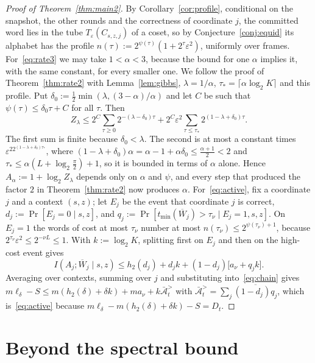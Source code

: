 \documentclass[aps,prx,twocolumn,superscriptaddress,nofootinbib,longbibliography]{revtex4-2}
\theoremstyle{plain}
\theoremstyle{definition}
\theoremstyle{remark}
\begin{document}
\begin{proof}[Proof of Theorem~\ref{thm:main2}]
By Corollary~\ref{cor:profile}, conditional on the snapshot, the other rounds and the correctness of coordinate $j$, the committed word lies in the tube $T_\varepsilon(C_{s,z,j})$ of a coset, so by Conjecture~\ref{conj:equid} its alphabet has the profile $n(\tau):=2^{\psi(\tau)}(1+2^\tau\varepsilon^2)$, uniformly over frames. For~\eqref{eq:rate3} we may take $1<\alpha<3$, because the bound for one $\alpha$ implies it, with the same constant, for every smaller one. We follow the proof of Theorem~\ref{thm:rate2} with Lemma~\ref{lem:gibbs}, $\lambda=1/\alpha$, $\tau_*=\lceil\alpha\log_2K\rceil$ and this profile. Put $\delta_0:=\tfrac12\min(\lambda,(3-\alpha)/\alpha)$ and let $C$ be such that $\psi(\tau)\le\delta_0\tau+C$ for all $\tau$. Then
\[
Z_\lambda\le2^C\sum_{\tau\ge0}2^{-(\lambda-\delta_0)\tau}+2^C\varepsilon^2\sum_{\tau\le\tau_*}2^{(1-\lambda+\delta_0)\tau}.
\]
The first sum is finite because $\delta_0<\lambda$. The second is at most a constant times $\varepsilon^22^{(1-\lambda+\delta_0)\tau_*}$, where $(1-\lambda+\delta_0)\alpha=\alpha-1+\alpha\delta_0\le\tfrac{\alpha+1}2<2$ and $\tau_*\le\alpha(L+\log_2\tfrac\pi2)+1$, so it is bounded in terms of $\alpha$ alone. Hence $A_\alpha:=1+\log_2Z_\lambda$ depends only on $\alpha$ and $\psi$, and every step that produced the factor $2$ in Theorem~\ref{thm:rate2} now produces $\alpha$. For~\eqref{eq:active}, fix a coordinate $j$ and a context $(s,z)$; let $E_j$ be the event that coordinate $j$ is correct, $d_j:=\Pr[E_j=0\mid s,z]$, and $q_j:=\Pr[t_{\min}(\overline W_j)>\tau_\nu\mid E_j=1,s,z]$. On $E_j=1$ the words of cost at most $\tau_\nu$ number at most $n(\tau_\nu)\le2^{\psi(\tau_\nu)+1}$, because $2^{\tau_\nu}\varepsilon^2\le2^{-\nu L}\le1$. With $k:=\log_2K$, splitting first on $E_j$ and then on the high-cost event gives
\[
I(A_j;\overline W_j\mid s,z)\le h_2(d_j)+d_jk+(1-d_j)\big[a_\nu+q_jk\big].
\]
Averaging over contexts, summing over $j$ and substituting into~\eqref{eq:chain} gives $m\ell_\delta-S\le m(h_2(\delta)+\delta k)+ma_\nu+k\bar{\mathcal A}^{>}_t$ with $\bar{\mathcal A}^{>}_t=\sum_j\overline{(1-d_j)q_j}$, which is~\eqref{eq:active} because $m\ell_\delta-m(h_2(\delta)+\delta k)-S=D_t$.
\end{proof}

\section{Beyond the spectral bound}\label{app:beyond}
\end{document}
